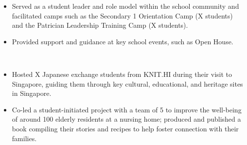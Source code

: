 \documentclass[a4paper,10pt]{article}
\begin{document}
\begin{center}
\begin{minipage}{1\textwidth}
      \vspace{0.15cm}

      \begin{itemize}[left=0pt, labelsep=0.5em, itemsep=0pt, topsep=0pt, parsep=0pt, partopsep=0pt]
        \item \small\lato Served as a student leader and role model within the school community and facilitated camps such as the Secondary 1 Orientation Camp (X students) and the Patrician Leadership Training Camp (X students).
        \item \small\lato Provided support and guidance at key school events, such as Open House.\\
      \end{itemize}

      \normalsize\noindent{}\\[-0.25cm]
      \makebox[\linewidth]{\rule{1.02\linewidth}{0.3pt}}

      \noindent
      \hfill
      \hfill

      \vspace{0.15cm}

      \begin{itemize}[left=0pt, labelsep=0.5em, itemsep=0pt, topsep=0pt, parsep=0pt, partopsep=0pt]
        \item \small\lato Hosted X Japanese exchange students from KNIT.HI during their visit to Singapore, guiding them through key cultural, educational, and heritage sites in Singapore.
      \end{itemize}

      \vspace{0.25cm}

      \noindent
      \hfill
      \hfill

      \vspace{0.15cm}

      \begin{itemize}[left=0pt, labelsep=0.5em, itemsep=0pt, topsep=0pt, parsep=0pt, partopsep=0pt]
        \item \small\lato Co-led a student-initiated project with a team of 5 to improve the well-being of around 100 elderly residents at a nursing home; produced and published a book compiling their stories and recipes to help foster connection with their families.\\
      \end{itemize}


\end{minipage}
\end{center}
\end{document}
